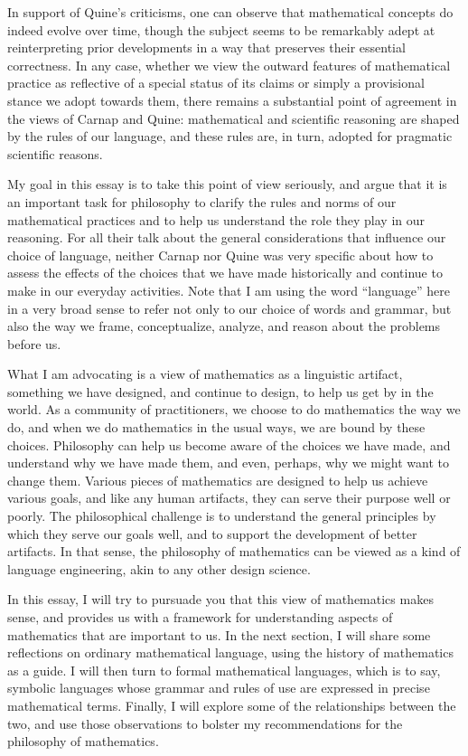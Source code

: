 \documentclass[11pt]{article}
\begin{document}
In support of Quine's criticisms, one can observe that mathematical concepts do indeed evolve over time, though the subject seems to be remarkably adept at reinterpreting prior developments in a way that preserves their essential correctness. In any case, whether we view the outward features of mathematical practice as reflective of a special status of its claims or simply a provisional stance we adopt towards them, there remains a substantial point of agreement in the views of Carnap and Quine: mathematical and scientific reasoning are shaped by the rules of our language, and these rules are, in turn, adopted for pragmatic scientific reasons.

My goal in this essay is to take this point of view seriously, and argue that it is an important task for philosophy to clarify the rules and norms of our mathematical practices and to help us understand the role they play in our reasoning. For all their talk about the general considerations that influence our choice of language, neither Carnap nor Quine was very specific about how to assess the effects of the choices that we have made historically and continue to make in our everyday activities. Note that I am using the word ``language'' here in a very broad sense to refer not only to our choice of words and grammar, but also the way we frame, conceptualize, analyze, and reason about the problems before us.

What I am advocating is a view of mathematics as a linguistic artifact, something we have designed, and continue to design, to help us get by in the world. As a community of practitioners, we choose to do mathematics the way we do, and when we do mathematics in the usual ways, we are bound by these choices. Philosophy can help us become aware of the choices we have made, and understand why we have made them, and even, perhaps, why we might want to change them. Various pieces of mathematics are designed to help us achieve various goals, and like any human artifacts, they can serve their purpose well or poorly. The philosophical challenge is to understand the general principles by which they serve our goals well, and to support the development of better artifacts. In that sense, the philosophy of mathematics can be viewed as a kind of language engineering, akin to any other design science.

In this essay, I will try to pursuade you that this view of mathematics makes sense, and provides us with a framework for understanding aspects of mathematics that are important to us. In the next section, I will share some reflections on ordinary mathematical language, using the history of mathematics as a guide. I will then turn to formal mathematical languages, which is to say, symbolic languages whose grammar and rules of use are expressed in precise mathematical terms. Finally, I will explore some of the relationships between the two, and use those observations to bolster my recommendations for the philosophy of mathematics. 
\end{document}
